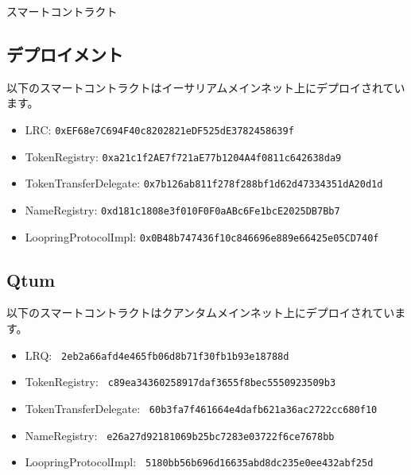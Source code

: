 \documentclass{article}
\makeatletter
\newenvironment{figurehere}
 {\def\@captype{figure}}
 {}
\makeatother
\begin{document}
\begin{appendices}
\begin{center}
\begin{figurehere}
\caption{スマートコントラクト}
\label{fig:smartcontracts}
\end{figurehere}
\end{center}

\subsection{デプロイメント}

以下のスマートコントラクトはイーサリアムメインネット上にデプロイされています。

\begin{itemize}
\item LRC: \verb|0xEF68e7C694F40c8202821eDF525dE3782458639f|
\item TokenRegistry: \verb|0xa21c1f2AE7f721aE77b1204A4f0811c642638da9|
\item TokenTransferDelegate: \verb|0x7b126ab811f278f288bf1d62d47334351dA20d1d|
\item NameRegistry: \verb|0xd181c1808e3f010F0F0aABc6Fe1bcE2025DB7Bb7|
\item LoopringProtocolImpl: \verb|0x0B48b747436f10c846696e889e66425e05CD740f|
\end{itemize}

\subsection{Qtum}
以下のスマートコントラクトはクアンタムメインネット上にデプロイされています。
\begin{itemize}
\item LRQ: \verb| 2eb2a66afd4e465fb06d8b71f30fb1b93e18788d |
\item TokenRegistry: \verb| c89ea34360258917daf3655f8bec5550923509b3 |
\item TokenTransferDelegate: \verb| 60b3fa7f461664e4dafb621a36ac2722cc680f10 |
\item NameRegistry: \verb| e26a27d92181069b25bc7283e03722f6ce7678bb |
\item LoopringProtocolImpl: \verb| 5180bb56b696d16635abd8dc235e0ee432abf25d |
\end{itemize}


\end{appendices}
\end{document}
